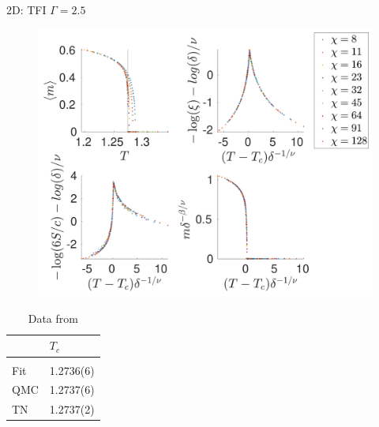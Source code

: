 \begin{frame}{2D: TFI $\Gamma=2.5$}
    \begin{minipage}{.75\textwidth}
        \begin{figure}
            \center
            \includegraphics[height=\textheight]{../Figuren/phasediag/g25/zoomed_small.pdf}
        \end{figure}
    \end{minipage}
    \begin{minipage}{.24\textwidth}
        \begin{table}[]

            \begin{tabular}{l|l }
                    & $T_c$     \\
                \hline          \\
                Fit & 1.2736(6) \\
                QMC & 1.2737(6) \\
                TN  & 1.2737(2) \\
            \end{tabular}
            \caption*{Data from  \cite{Czarnik2019} }
        \end{table}
    \end{minipage}
\end{frame}
